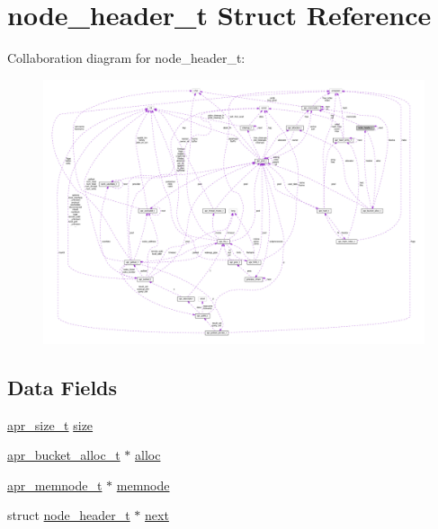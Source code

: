 \hypertarget{structnode__header__t}{}\section{node\+\_\+header\+\_\+t Struct Reference}
\label{structnode__header__t}


Collaboration diagram for node\+\_\+header\+\_\+t\+:
\nopagebreak
\begin{figure}[H]
\begin{center}
\leavevmode
\includegraphics[width=350pt]{structnode__header__t__coll__graph}
\end{center}
\end{figure}
\subsection*{Data Fields}
\begin{DoxyCompactItemize}
\item 
\hyperlink{group__apr__platform_gaaa72b2253f6f3032cefea5712a27540e}{apr\+\_\+size\+\_\+t} \hyperlink{structnode__header__t_a9406a1f564650e30801ed484fb531486}{size}
\item 
\hyperlink{structapr__bucket__alloc__t}{apr\+\_\+bucket\+\_\+alloc\+\_\+t} $\ast$ \hyperlink{structnode__header__t_aecdddf457878b6b7780ced82c161c676}{alloc}
\item 
\hyperlink{structapr__memnode__t}{apr\+\_\+memnode\+\_\+t} $\ast$ \hyperlink{structnode__header__t_ac2e9fc463b234297da84034b02a08209}{memnode}
\item 
struct \hyperlink{structnode__header__t}{node\+\_\+header\+\_\+t} $\ast$ \hyperlink{structnode__header__t_a2995afb43a348936ed006281fd395d04}{next}
\end{DoxyCompactItemize}


